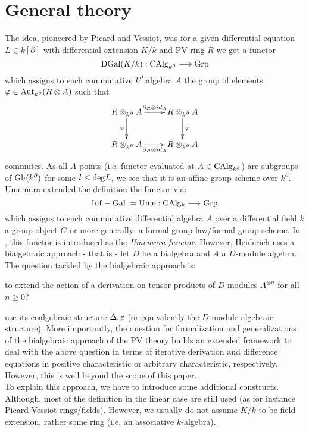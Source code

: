\section{General theory}
The idea, pioneered by Picard and Vessiot, was for a given differential equation $L \in k[\partial]$ with differential extension $K/k$ and PV ring $R$ we get a functor
$$\mathrm{DGal}(K/k) : \mathrm{CAlg}_{k^\partial} \longrightarrow \mathrm{Grp}$$
which assigns to each commutative $k^\partial$ algebra $A$ the group of elements $\varphi \in \mathrm{Aut}_{k^\partial}(R \otimes A)$ such that
$$\xymatrix{
R \otimes_{k^\partial} A \ar[r]^{\partial_R \otimes id_A} \ar[d]_\varphi &R\otimes_{k^\partial} A\ar[d]^\varphi\\
R \otimes_{k^\partial} A \ar[r]_{\partial_R \otimes id_A} & R \otimes_{k^\partial} A\\
}$$
commutes. As all $A$ points (i.e. functor evaluated at $A \in \mathrm{CAlg}_{k^ \partial}$) are subgroups of $\mathrm{Gl}_l(k^\partial)$ for some $l \leq \mathrm{deg} L$, we see that it is an affine group scheme over $k^\partial$. Umemura extended the definition the functor via:
$$\mathrm{Inf-Gal} := \mathrm{Ume} : \mathrm{CAlg_k} \longrightarrow \mathrm{Grp}$$
which assigns to each commutative differential algebra $A$ over a differential field $k$ a group object $G$ or more generally: a formal group law/formal group scheme. In \cite{Heid13}, this functor is introduced as the \textit{Umemura-functor}. However, Heiderich uses a bialgebraic approach - that is - let $D$ be a bialgebra and $A$ a $D$-module algebra. The question tackled by the bialgebraic approach is:
\bd
\item[How] to extend the action of a derivation on tensor products of $D$-modules $A^{\otimes n}$ for all $n \geq 0$?\\
\item[Answer] use its coalgebraic structure $\Delta, \varepsilon$ (or equivalently the $D$-module algebraic structure).
\ed
More importantly, the question for formalization and generalizations of the bialgebraic approach of the PV theory builds an extended framework to deal with the above question in terms of iterative derivation and difference equations in positive characteristic or arbitrary characteristic, respectively. However, this is well beyond the scope of this paper.\\
\indent To explain this approach, we have to introduce some additional constructs. Although, most of the definition in the linear case are still used (as for instance Picard-Vessiot rings/fields). However, we usually do not assume $K/k$ to be field extension, rather some ring (i.e. an associative $k$-algebra).
